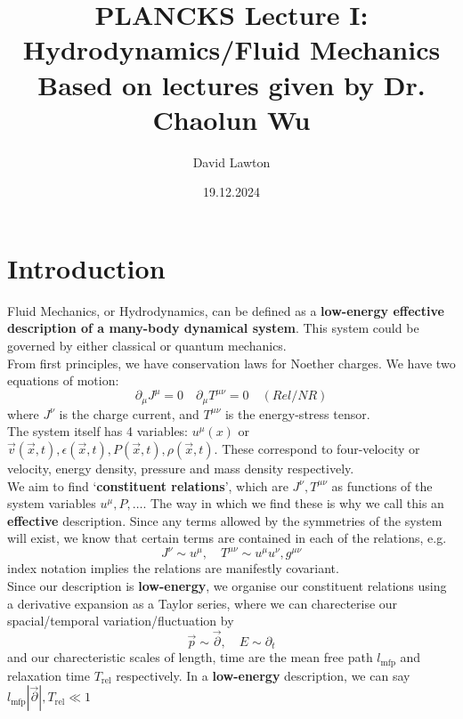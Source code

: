 \documentclass{article}
\title{PLANCKS Lecture I: Hydrodynamics/Fluid Mechanics\\ Based on lectures given by Dr. Chaolun Wu}
\author{David Lawton}
\date{19.12.2024}
\theoremstyle{definition}
\theoremstyle{remark}
\begin{document}
\maketitle
\newpage
\tableofcontents
\newpage
\section{Introduction}
Fluid Mechanics, or Hydrodynamics, can be defined as a \textbf{low-energy effective description of a many-body dynamical system}. This system could be governed by either classical or quantum mechanics.\\
From first principles, we have conservation laws for Noether charges. We have two equations of motion:
\begin{equation}
    \partial_\mu J^\mu = 0 \quad \partial_\mu T^{\mu\nu} = 0 \quad(Rel/NR)
\end{equation}
where $J^\nu$ is the charge current, and $T^{\mu\nu}$ is the energy-stress tensor.\\
\indent The system itself has 4 variables: $u^\mu(x)$ or $\vec{v}(\vec{x},t), \epsilon(\vec{x}, t), P(\vec{x},t), \rho(\vec{x}, t)$. These correspond to four-velocity or velocity, energy density, pressure and mass density respectively.\\
\indent We aim to find `\textbf{constituent relations}', which are $J^\nu,T^{\mu\nu}$ as functions of the system variables $u^\mu, P, \dots$. The way in which we find these is why we call this an \textbf{effective} description. Since any terms allowed by the symmetries of the system will exist, we know that certain terms are contained in each of the relations, e.g.
\begin{equation}
J^\nu \sim u^\mu,\quad T^{\mu\nu} \sim u^\mu u^\nu, g^{\mu\nu}
\end{equation}
index notation implies the relations are manifestly covariant.\\
\indent Since our description is \textbf{low-energy}, we organise our constituent relations using a derivative expansion as a Taylor series, where we can charecterise our spacial/temporal variation/fluctuation by
\begin{equation}
    \vec{p}\sim\vec{\partial},\quad E \sim \partial_t
\end{equation}
and our charecteristic scales of length, time are the mean free path $l_{\mathrm{mfp}}$ and relaxation time $T_{\mathrm{rel}}$ respectively. In a \textbf{low-energy} description, we can say $l_{\mathrm{mfp}}|\vec{\partial}|, T_{\mathrm{rel}} \ll 1$
\end{document}
